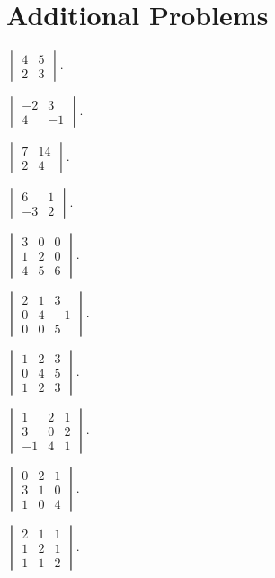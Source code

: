 \section{Additional Problems}

\begin{problems}
  \item $\begin{vmatrix} 4 & 5 \\ 2 & 3 \end{vmatrix}$.
  \item $\begin{vmatrix} -2 & 3 \\ 4 & -1 \end{vmatrix}$.
  \item $\begin{vmatrix} 7 & 14 \\ 2 & 4 \end{vmatrix}$.
  \item $\begin{vmatrix} 6 & 1 \\ -3 & 2 \end{vmatrix}$.
  \item $\begin{vmatrix} 3 & 0 & 0 \\ 1 & 2 & 0 \\ 4 & 5 & 6 \end{vmatrix}$.
  \item $\begin{vmatrix} 2 & 1 & 3 \\ 0 & 4 & -1 \\ 0 & 0 & 5 \end{vmatrix}$.
  \item $\begin{vmatrix} 1 & 2 & 3 \\ 0 & 4 & 5 \\ 1 & 2 & 3 \end{vmatrix}$.
  \item $\begin{vmatrix} 1 & 2 & 1 \\ 3 & 0 & 2 \\ -1 & 4 & 1 \end{vmatrix}$.
  \item $\begin{vmatrix} 0 & 2 & 1 \\ 3 & 1 & 0 \\ 1 & 0 & 4 \end{vmatrix}$.
  \item $\begin{vmatrix} 2 & 1 & 1 \\ 1 & 2 & 1 \\ 1 & 1 & 2 \end{vmatrix}$.

\end{problems}
